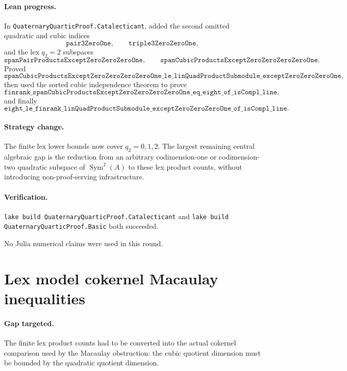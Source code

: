 \documentclass[11pt]{article}
\begin{document}
\paragraph{Lean progress.}
In \texttt{QuaternaryQuarticProof.Catalecticant}, added the second omitted
quadratic and cubic indices
\[
\texttt{pair3ZeroOne},
\qquad
\texttt{triple3ZeroZeroOne},
\]
and the lex \(q_2=2\) subspaces
\[
\texttt{spanPairProductsExceptZeroZeroZeroOne},
\qquad
\texttt{spanCubicProductsExceptZeroZeroZeroZeroOne}.
\]
Proved
\[
\texttt{spanCubicProductsExceptZeroZeroZeroZeroOne\_le\_linQuadProductSubmodule\_exceptZeroZeroZeroOne},
\]
then used the sorted cubic independence theorem to prove
\[
\texttt{finrank\_spanCubicProductsExceptZeroZeroZeroZeroOne\_eq\_eight\_of\_isCompl\_line},
\]
and finally
\[
\texttt{eight\_le\_finrank\_linQuadProductSubmodule\_exceptZeroZeroZeroOne\_of\_isCompl\_line}.
\]

\paragraph{Strategy change.}
The finite lex lower bounds now cover \(q_2=0,1,2\).  The largest remaining
central algebraic gap is the reduction from an arbitrary codimension-one or
codimension-two quadratic subspace of \(\operatorname{Sym}^2(A)\) to these
lex product counts, without introducing non-proof-serving infrastructure.

\paragraph{Verification.}
\texttt{lake build QuaternaryQuarticProof.Catalecticant} and
\texttt{lake build QuaternaryQuarticProof.Basic} both succeeded.

No Julia numerical claims were used in this round.

\section*{Lex model cokernel Macaulay inequalities}

\paragraph{Gap targeted.}
The finite lex product counts had to be converted into the actual cokernel
comparison used by the Macaulay obstruction: the cubic quotient dimension
must be bounded by the quadratic quotient dimension.
\end{document}
